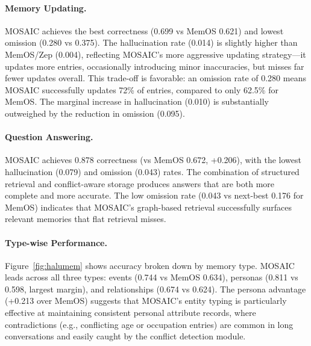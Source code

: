 \documentclass[10pt,twocolumn]{article}
\begin{document}
\paragraph{Memory Updating.}
MOSAIC achieves the best correctness (0.699 vs MemOS 0.621) and lowest
omission (0.280 vs 0.375). The hallucination rate (0.014) is slightly higher
than MemOS/Zep (0.004), reflecting MOSAIC's more aggressive updating
strategy---it updates more entries, occasionally introducing minor
inaccuracies, but misses far fewer updates overall. This trade-off is
favorable: an omission rate of 0.280 means MOSAIC successfully updates 72\%
of entries, compared to only 62.5\% for MemOS. The marginal increase in
hallucination (0.010) is substantially outweighed by the reduction in
omission (0.095).

\paragraph{Question Answering.}
MOSAIC achieves 0.878 correctness (vs MemOS 0.672, +0.206), with the lowest
hallucination (0.079) and omission (0.043) rates. The combination of
structured retrieval and conflict-aware storage produces answers that are
both more complete and more accurate. The low omission rate (0.043 vs
next-best 0.176 for MemOS) indicates that MOSAIC's graph-based retrieval
successfully surfaces relevant memories that flat retrieval misses.

\paragraph{Type-wise Performance.}
Figure~\ref{fig:halumem} shows accuracy broken down by memory type. MOSAIC
leads across all three types: events (0.744 vs MemOS 0.634), personas (0.811
vs 0.598, largest margin), and relationships (0.674 vs 0.624). The persona
advantage (+0.213 over MemOS) suggests that MOSAIC's entity typing is
particularly effective at maintaining consistent personal attribute records,
where contradictions (e.g., conflicting age or occupation entries) are
common in long conversations and easily caught by the conflict detection
module.
\end{document}
